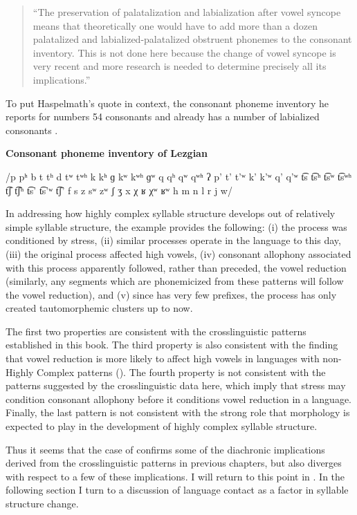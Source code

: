 \begin{quote}
“The preservation of palatalization and labialization after vowel syncope means that theoretically one would have to add more than a dozen palatalized and labialized-palatalized obstruent phonemes to the consonant inventory. This is not done here because the change of vowel syncope is very recent and more research is needed to determine precisely all its implications.”
\citep[38]{Haspelmath1993}
\end{quote}

To put Haspelmath’s quote in context, the consonant phoneme inventory he reports for  numbers 54 consonants and already has a number of labialized consonants .

\ea\label{ex:8.4}
  \textbf{Consonant phoneme inventory of Lezgian}

/p pʰ b t tʰ d tʷ tʷʰ k kʰ ɡ kʷ kʷʰ ɡʷ q qʰ qʷ qʷʰ ʔ p’ t’ t’ʷ k’ k’ʷ q’ q’ʷ t͡s t͡sʰ t͡sʷ t͡sʷʰ t͡ʃ t͡ʃʰ t͡s’ t͡s’ʷ t͡ʃ’ f s z sʷ zʷ ʃ ʒ x χ ʁ χʷ ʁʷ h m n l r j w/
\z

  In addressing how highly complex syllable structure develops out of relatively simple syllable structure, the  example provides the following: (i) the process was conditioned by stress, (ii) similar processes operate in the language to this day, (iii) the original process affected high vowels, (iv) consonant allophony associated with this process apparently followed, rather than preceded, the vowel reduction (similarly, any segments which are phonemicized from these patterns will follow the vowel reduction), and (v) since  has very few prefixes, the process has only created tautomorphemic clusters up to now. 

  The first two properties are consistent with the crosslinguistic patterns established in this book. The third property is also consistent with the finding that vowel reduction is more likely to affect high vowels in languages with non-Highly Complex patterns (). The fourth property is not consistent with the patterns suggested by the crosslinguistic data here, which imply that stress may condition consonant allophony before it conditions vowel reduction in a language. Finally, the last pattern is not consistent with the strong role that morphology is expected to play in the development of highly complex syllable structure.

  Thus it seems that the case of  confirms some of the diachronic implications derived from the crosslinguistic patterns in previous chapters, but also diverges with respect to a few of these implications. I will return to this point in . In the following section I turn to a discussion of language contact as a factor in syllable structure change.

